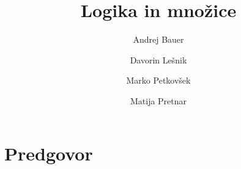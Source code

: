 \documentclass[11pt,a4paper,twoside]{book}
\begin{document}

\title{Logika in množice} %
\author{Andrej Bauer \and Davorin Lešnik \and Marko Petkovšek \and Matija Pretnar}
\maketitle


\chapter*{Predgovor}%


\tableofcontents














\end{document}
